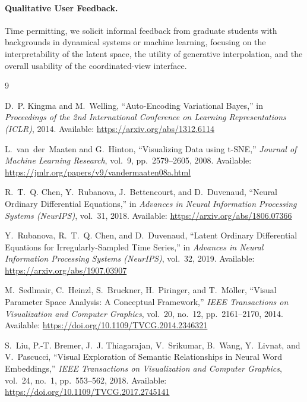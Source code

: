 \documentclass{article}
\begin{document}
\paragraph{Qualitative User Feedback.}
Time permitting, we solicit informal feedback from graduate students with
backgrounds in dynamical systems or machine learning, focusing on the
interpretability of the latent space, the utility of generative interpolation,
and the overall usability of the coordinated-view interface.



\begin{thebibliography}{9}

D.~P. Kingma and M.~Welling,
``Auto-Encoding Variational Bayes,''
in \emph{Proceedings of the 2nd International Conference on Learning
Representations (ICLR)}, 2014.
Available: \url{https://arxiv.org/abs/1312.6114}

L.~van~der~Maaten and G.~Hinton,
``Visualizing Data using t-SNE,''
\emph{Journal of Machine Learning Research}, vol.~9, pp.~2579--2605, 2008.
Available: \url{https://jmlr.org/papers/v9/vandermaaten08a.html}

R.~T.~Q. Chen, Y.~Rubanova, J.~Bettencourt, and D.~Duvenaud,
``Neural Ordinary Differential Equations,''
in \emph{Advances in Neural Information Processing Systems (NeurIPS)}, vol.~31,
2018.
Available: \url{https://arxiv.org/abs/1806.07366}

Y.~Rubanova, R.~T.~Q. Chen, and D.~Duvenaud,
``Latent Ordinary Differential Equations for Irregularly-Sampled Time Series,''
in \emph{Advances in Neural Information Processing Systems (NeurIPS)}, vol.~32,
2019.
Available: \url{https://arxiv.org/abs/1907.03907}

M.~Sedlmair, C.~Heinzl, S.~Bruckner, H.~Piringer, and T.~M{\"o}ller,
``Visual Parameter Space Analysis: A Conceptual Framework,''
\emph{IEEE Transactions on Visualization and Computer Graphics}, vol.~20,
no.~12, pp.~2161--2170, 2014.
Available: \url{https://doi.org/10.1109/TVCG.2014.2346321}

S.~Liu, P.-T. Bremer, J.~J. Thiagarajan, V.~Srikumar, B.~Wang, Y.~Livnat,
and V.~Pascucci,
``Visual Exploration of Semantic Relationships in Neural Word Embeddings,''
\emph{IEEE Transactions on Visualization and Computer Graphics}, vol.~24,
no.~1, pp.~553--562, 2018.
Available: \url{https://doi.org/10.1109/TVCG.2017.2745141}


\end{thebibliography}
\end{document}
